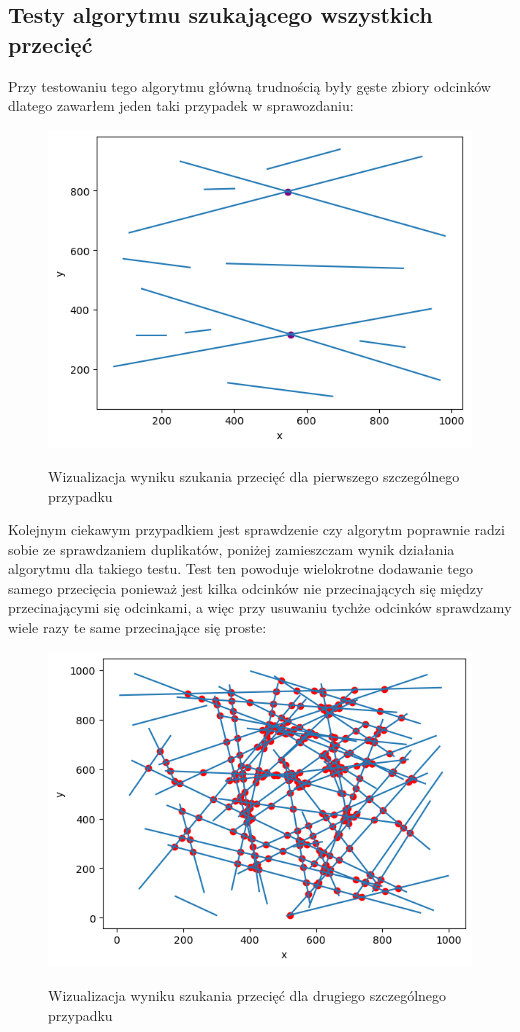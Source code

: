 \documentclass[a4paper]{article}
\begin{document}
\subsection{Testy algorytmu szukającego wszystkich przecięć}
Przy testowaniu tego algorytmu główną trudnością były gęste zbiory odcinków dlatego zawarłem jeden taki 
przypadek w sprawozdaniu:
\begin{figure}[H]
    \centering
    \includegraphics[width=\textwidth]{wizualizacje/find_random_edge_case_1.png}
    \label{fig:find_intersect_random_edgecase_1}
    \caption{Wizualizacja wyniku szukania przecięć dla pierwszego szczególnego przypadku}
\end{figure}

Kolejnym ciekawym przypadkiem jest sprawdzenie czy algorytm poprawnie radzi sobie ze sprawdzaniem 
duplikatów, poniżej zamieszczam wynik działania algorytmu dla takiego testu. Test ten powoduje
wielokrotne dodawanie tego samego przecięcia ponieważ jest kilka odcinków nie przecinających się 
między przecinającymi się odcinkami, a więc przy usuwaniu tychże odcinków sprawdzamy wiele 
razy te same przecinające się proste:

\begin{figure}[H]
    \centering
    \includegraphics[width=.8\textwidth]{wizualizacje/find_random_edge_case_2.png}
    \label{fig:find_intersect_random_edgecase_2}
    \caption{Wizualizacja wyniku szukania przecięć dla drugiego szczególnego przypadku}
\end{figure}
\end{document}
